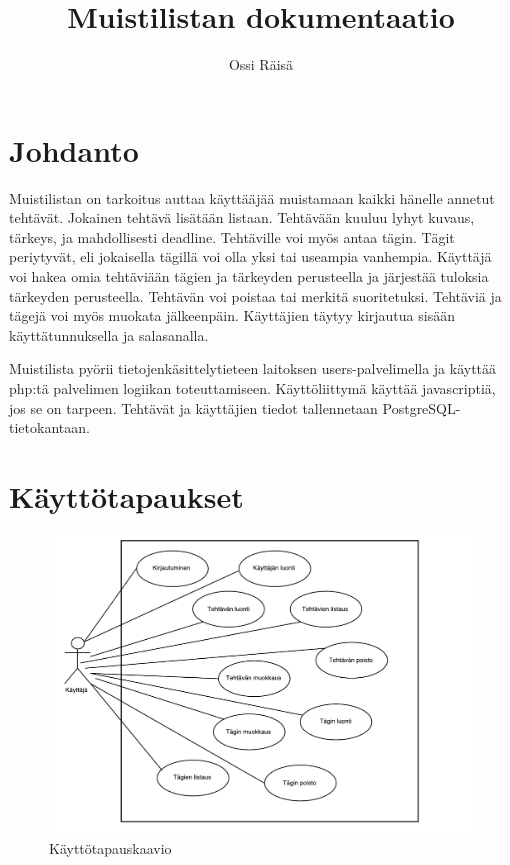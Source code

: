 \documentclass[a4paper, 12pt, finnish]{article}
\title{Muistilistan dokumentaatio}
\author{Ossi Räisä}
\begin{document}
\maketitle

\section{Johdanto}

Muistilistan on tarkoitus auttaa käyttääjää muistamaan kaikki hänelle annetut tehtävät.
Jokainen tehtävä lisätään listaan. Tehtävään kuuluu lyhyt kuvaus, tärkeys, ja mahdollisesti
deadline. Tehtäville voi myös antaa tägin. Tägit periytyvät, eli jokaisella tägillä voi olla
yksi tai useampia vanhempia. Käyttäjä voi hakea omia tehtäviään tägien ja tärkeyden perusteella
ja järjestää tuloksia tärkeyden perusteella. Tehtävän voi poistaa tai merkitä suoritetuksi.
Tehtäviä ja tägejä voi myös muokata jälkeenpäin. Käyttäjien täytyy kirjautua sisään käyttätunnuksella
ja salasanalla.

Muistilista pyörii tietojenkäsittelytieteen laitoksen users-palvelimella ja käyttää php:tä
palvelimen logiikan toteuttamiseen. Käyttöliittymä käyttää javascriptiä, jos se on tarpeen.
Tehtävät ja käyttäjien tiedot tallennetaan PostgreSQL-tietokantaan.

\newpage

\section{Käyttötapaukset}

\begin{figure}[h]
  \caption{Käyttötapauskaavio}
  \centering
  \includegraphics[scale=0.7]{kayttotapauskaavio}
\end{figure}
\end{document}
